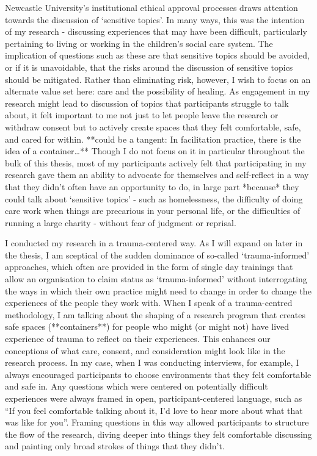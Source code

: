 Newcastle University’s institutional ethical approval processes draws attention towards the discussion of ‘sensitive topics’. In many ways, this was the intention of my research - discussing experiences that may have been difficult, particularly pertaining to living or working in the children’s social care system. The implication of questions such as these are that sensitive topics should be avoided, or if it is unavoidable, that the risks around the discussion of sensitive topics should be mitigated. Rather than eliminating risk, however, I wish to focus on an alternate value set here: care and the possibility of healing. As engagement in my research might lead to discussion of topics that participants struggle to talk about, it felt important to me not just to let people leave the research or withdraw consent but to actively create spaces that they felt comfortable, safe, and cared for within. **could be a tangent: In facilitation practice, there is the idea of a container…** Though I do not focus on it in particular throughout the bulk of this thesis, most of my participants actively felt that participating in my research gave them an ability to advocate for themselves and self-reflect in a way that they didn’t often have an opportunity to do, in large part *because* they could talk about ‘sensitive topics’ - such as homelessness, the difficulty of doing care work when things are precarious in your personal life, or the difficulties of running a large charity  - without fear of judgment or reprisal. 

I conducted my research in a trauma-centered way. As I will expand on later in the thesis, I am sceptical of the sudden dominance of so-called ‘trauma-informed’ approaches, which often are provided in the form of single day trainings that allow an organisation to claim status as ‘trauma-informed’ without interrogating the ways in which their own practice might need to change in order to change the experiences of the people they work with. When I speak of a trauma-centred methodology, I am talking about the shaping of a research program that creates safe spaces (**containers**) for people who might (or might not) have lived experience of trauma to reflect on their experiences. This enhances our conceptions of what care, consent, and consideration might look like in the research process. In my case, when I was conducting interviews, for example, I always encouraged participants to choose environments that they felt comfortable and safe in. Any questions which were centered on potentially difficult experiences were always framed in open, participant-centered language, such as “If you feel comfortable talking about it, I’d love to hear more about what that was like for you”. Framing questions in this way allowed participants to structure the flow of the research, diving deeper into things they felt comfortable discussing and painting only broad strokes of things that they didn’t. 

